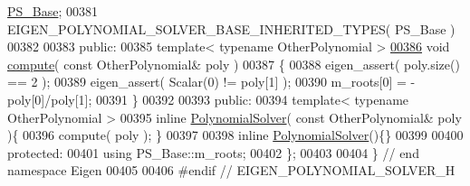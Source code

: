 \begin{DoxyCode}
      \hyperlink{class_eigen_1_1_polynomial_solver_base}{PS\_Base};
00381     EIGEN\_POLYNOMIAL\_SOLVER\_BASE\_INHERITED\_TYPES( PS\_Base )
00382 
00383   \textcolor{keyword}{public}:
00385     \textcolor{keyword}{template}< \textcolor{keyword}{typename} OtherPolynomial >
\hyperlink{class_eigen_1_1_polynomial_solver_3_01___scalar_00_011_01_4_ac10c32870abba4461d681506eaa63e18}{00386}     \textcolor{keywordtype}{void} \hyperlink{class_eigen_1_1_polynomial_solver_3_01___scalar_00_011_01_4_ac10c32870abba4461d681506eaa63e18}{compute}( \textcolor{keyword}{const} OtherPolynomial& poly )
00387     \{
00388       eigen\_assert( poly.size() == 2 );
00389       eigen\_assert( Scalar(0) != poly[1] );
00390       m\_roots[0] = -poly[0]/poly[1];
00391     \}
00392 
00393   \textcolor{keyword}{public}:
00394     \textcolor{keyword}{template}< \textcolor{keyword}{typename} OtherPolynomial >
00395     \textcolor{keyword}{inline} \hyperlink{class_eigen_1_1_polynomial_solver}{PolynomialSolver}( \textcolor{keyword}{const} OtherPolynomial& poly )\{
00396       compute( poly ); \}
00397 
00398     \textcolor{keyword}{inline} \hyperlink{class_eigen_1_1_polynomial_solver}{PolynomialSolver}()\{\}
00399 
00400   \textcolor{keyword}{protected}:
00401     \textcolor{keyword}{using}                   PS\_Base::m\_roots;
00402 \};
00403 
00404 \} \textcolor{comment}{// end namespace Eigen}
00405 
00406 \textcolor{preprocessor}{#endif // EIGEN\_POLYNOMIAL\_SOLVER\_H}
\end{DoxyCode}
